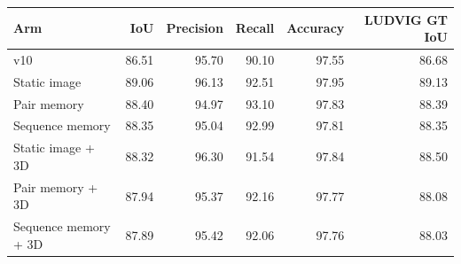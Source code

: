 \begin{tabular}{lrrrrr}
\toprule
Arm & IoU & Precision & Recall & Accuracy & LUDVIG GT IoU \\\midrule
v10 & 86.51 & 95.70 & 90.10 & 97.55 & 86.68 \\
Static image & 89.06 & 96.13 & 92.51 & 97.95 & 89.13 \\
Pair memory & 88.40 & 94.97 & 93.10 & 97.83 & 88.39 \\
Sequence memory & 88.35 & 95.04 & 92.99 & 97.81 & 88.35 \\
Static image + 3D & 88.32 & 96.30 & 91.54 & 97.84 & 88.50 \\
Pair memory + 3D & 87.94 & 95.37 & 92.16 & 97.77 & 88.08 \\
Sequence memory + 3D & 87.89 & 95.42 & 92.06 & 97.76 & 88.03 \\
\bottomrule
\end{tabular}
